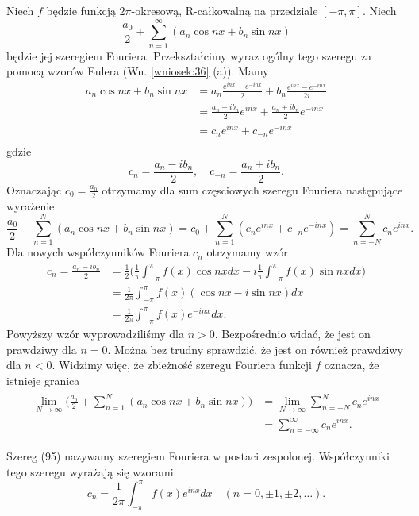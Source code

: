 \documentclass[leqno]{article}
\begin{document}
\begin{justify}
\noindent
Niech $f$ będzie funkcją $2\pi$-okresową, R-całkowalną na przedziale $[-\pi, \pi]$. Niech
\[
    \frac{a_0}{2} + \sum_{n=1}^{\infty}(a_n \cos nx + b_n \sin nx)
\]
będzie jej szeregiem Fouriera. Przekształcimy wyraz ogólny tego szeregu za pomocą wzorów Eulera (Wn. \ref{wniosek:36} (a)). Mamy
\begin{align*}
   a_n \cos nx + b_n \sin nx &= a_n \frac{e^{inx} + e^{-inx}}{2} + b_n \frac{e^{inx} - e^{-inx}}{2i} \\
                            &= \frac{a_n - ib_n}{2}e^{inx} + \frac{a_n + i b_n}{2}e^{-inx} \\
                            &= c_n e^{inx} + c_{-n}e^{-inx} \\
\end{align*}
gdzie
\[
    c_n = \frac{a_n - ib_n}{2}, \quad c_{-n} = \frac{a_n + i b_n}{2}.
\]
Oznaczając $c_0 = \frac{a_0}{2}$ otrzymamy dla sum częsciowych szeregu Fouriera następujące wyrażenie
\[
    \frac{a_0}{2} + \sum_{n=1}^{N}(a_n \cos nx + b_n \sin nx) = c_0 + \sum_{n=1}^{N}(c_n e^{inx} + c_{-n}e^{-inx}) = \sum_{n=-N}^{N}c_n e^{inx}.
\]
Dla nowych współczynników Fouriera $c_n$ otrzymamy wzór
\begin{align*}
    c_n = \frac{a_n - i b_n}{2} &= \frac{1}{2}\Big(\frac{1}{\pi}\int_{-\pi}^{\pi}f(x) \cos nx dx - i \frac{1}{\pi}\int_{-\pi}^{\pi} f(x) \sin nx dx \Big) \\
                               &= \frac{1}{2\pi}\int_{-\pi}^{\pi}f(x)(\cos nx - i \sin nx) dx \\ 
                               &= \frac{1}{2\pi} \int_{-\pi}^{\pi}f(x)e^{-inx}dx.
\end{align*}
Powyższy wzór wyprowadziliśmy dla $n > 0$. Bezpośrednio widać, że jest on prawdziwy dla $n = 0$. Można bez trudny sprawdzić, że jest on również prawdziwy dla $n < 0$.
Widzimy więc, że zbieżność szeregu Fouriera funkcji $f$ oznacza, że istnieje granica
\begin{align}\label{eq:95}
\begin{split}
    \lim_{N \to \infty} \Big( \frac{a_0}{2} + \sum_{n=1}^{N}(a_n \cos nx + b_n \sin nx)\Big) 
    &= \lim_{N \to \infty} \sum_{n=-N}^{N}c_n e^{inx} \\
    &= \sum_{n=-\infty}^{\infty}c_n e^{inx}.
\end{split}
\end{align}

\begin{defn}
    Szereg (95) nazywamy szeregiem Fouriera w postaci zespolonej. Współczynniki tego szeregu wyrażają się wzorami:
    \[
        c_n = \frac{1}{2\pi}\int_{-\pi}^{\pi}f(x)e^{inx}dx \quad (n = 0, \pm 1, \pm 2, \ldots).
    \]
\end{defn}


\end{justify}
\end{document}
